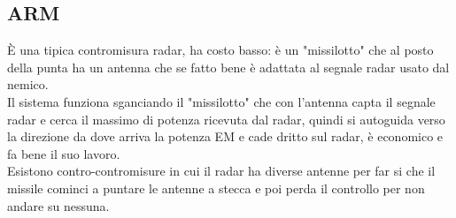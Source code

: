 \documentclass[oneside, 12pt]{extbook}
\begin{document}
\subsection{ARM}
È una tipica contromisura radar, ha costo basso: è un "missilotto" che al posto della punta ha un antenna che se fatto bene è adattata al segnale radar usato dal nemico.\\
Il sistema funziona sganciando il "missilotto" che con l'antenna capta il segnale radar e cerca il massimo di potenza ricevuta dal radar, quindi si autoguida verso la direzione da dove arriva la potenza EM e cade dritto sul radar, è economico e fa bene il suo lavoro.\\
Esistono contro-contromisure in cui il radar ha diverse antenne per far si che il missile cominci a puntare le antenne a stecca e poi perda il controllo per non andare su nessuna.
\end{document}
